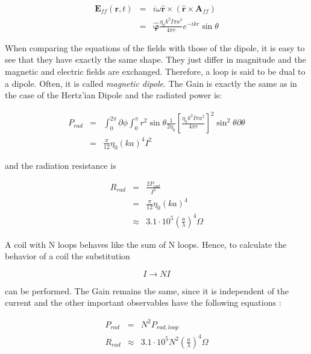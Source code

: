 \documentclass[a4paper,14pt]{extbook}
\begin{document}
\begin{eqnarray}
\mathbf{E}_{ff} (\mathbf{r},t)&=& i \omega \mathbf{\hat{r}} \times ( \mathbf{\hat{r}} \times \mathbf{A}_{ff}) \label{Eff_loop} \\
&=& \mathbf{\hat{\varphi}} \frac{\eta_0 k^2 I \pi a^2}{4 \pi r} e^{-ikr} \sin \theta \nonumber
\end{eqnarray}

When comparing the equations of the fields with those of the dipole, it is easy to see that they have exactly the same shape. They just differ in magnitude and the magnetic and electric fields are exchanged. Therefore, a loop is said to be dual to a dipole. Often, it is called \emph{magnetic dipole}. The Gain is exactly the same as in the case of the Hertz'ian Dipole and the radiated power is:

\begin{eqnarray}\label{total_power_loop}
P_{rad}&=& \int_0^{2\pi } \partial \phi \int_0^{\pi} r^2 \sin \theta \frac{1}{2 \eta_0} \left[ \frac{\eta_0 k^2 I \pi a^2}{4 \pi r} \right]^2 \sin^2 \theta \partial \theta  \\
&=& \frac{\pi}{12} \eta_0 (ka)^4 I^2 \nonumber
\end{eqnarray}

and the radiation resistance is

\begin{eqnarray}\label{radiation_resistance_loop}
R_{rad} &=& \frac{2 P_{rad}}{I^2} \\
&=&  \frac{\pi}{12} \eta_0 (ka)^4 \nonumber \\
&\approx& 3.1 \cdot 10^5  \left(\frac{a}{\lambda} \right)^4 \Omega \nonumber
\end{eqnarray}

A coil with N loops behaves like the sum of N loops. Hence, to calculate the behavior of a coil the substitution

\begin{equation}\label{coil_subst}
I\rightarrow NI
\end{equation}

can be performed. The Gain remains the same, since it is independent of the current and the other important observables have the following equations :

\begin{eqnarray}
P_{rad} &=&N^2 P_{rad,loop} \\
R_{rad} &\approx& 3.1 \cdot 10^5  N^2 \left(\frac{a}{\lambda} \right)^4 \Omega
\end{eqnarray}
\end{document}
